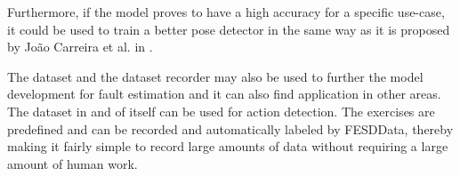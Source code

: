 Furthermore, if the model proves to have a high accuracy for a specific use-case, it could be used to train a better pose detector in the same way as it is proposed by Jo\~ao Carreira et al. in \cite{IterativeErrorFeedback}.

The dataset and the dataset recorder may also be used to further the model development for fault estimation and it can also find application in other areas. The dataset in and of itself can be used for action detection. The exercises are predefined and can be recorded and automatically labeled by FESDData, thereby making it fairly simple to record large amounts of data without requiring a large amount of human work.